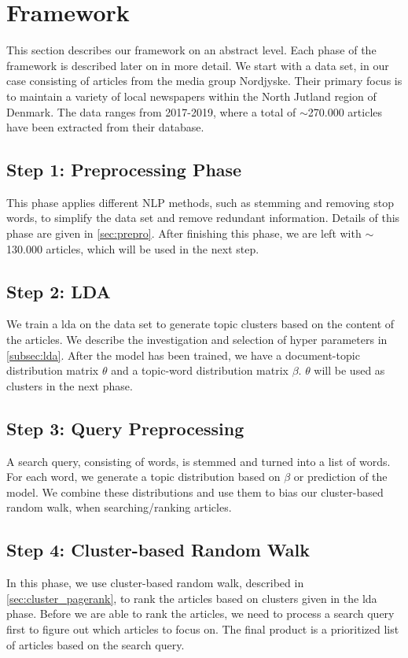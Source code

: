 \section{Framework}\label{sec:framework}
This section describes our framework on an abstract level.
Each phase of the framework is described later on in more detail. 
We start with a data set, in our case consisting of articles from the media group Nordjyske. Their primary focus is to maintain a variety of local newspapers within the North Jutland region of Denmark. 
The data ranges from 2017-2019, where a total of $\sim$270.000 articles have been extracted from their database.

\subsection*{Step 1: Preprocessing Phase}
This phase applies different \gls{NLP} methods, such as stemming and removing stop words, to simplify the data set and remove redundant information.
Details of this phase are given in \autoref{sec:prepro}.
After finishing this phase, we are left with $\sim$130.000 articles, which will be used in the next step.

\subsection*{Step 2: LDA}
We train a \acrfull{lda} on the data set to generate topic clusters based on the content of the articles. 
We describe the investigation and selection of hyper parameters in \autoref{subsec:lda}. 
After the model has been trained, we have a document-topic distribution matrix $\theta$ and a topic-word distribution matrix $\beta$.
$\theta$ will be used as clusters in the next phase.

\subsection*{Step 3: Query Preprocessing}
A search query, consisting of words, is stemmed and turned into a list of words.
For each word, we generate a topic distribution based on $\beta$ or prediction of the model.
We combine these distributions and use them to bias our cluster-based random walk, when searching/ranking articles.


\subsection*{Step 4: Cluster-based Random Walk}
In this phase, we use cluster-based random walk, described in \autoref{sec:cluster_pagerank}, to rank the articles based on clusters given in the \gls{lda} phase.
Before we are able to rank the articles, we need to process a search query first to figure out which articles to focus on.
The final product is a prioritized list of articles based on the search query.


%
